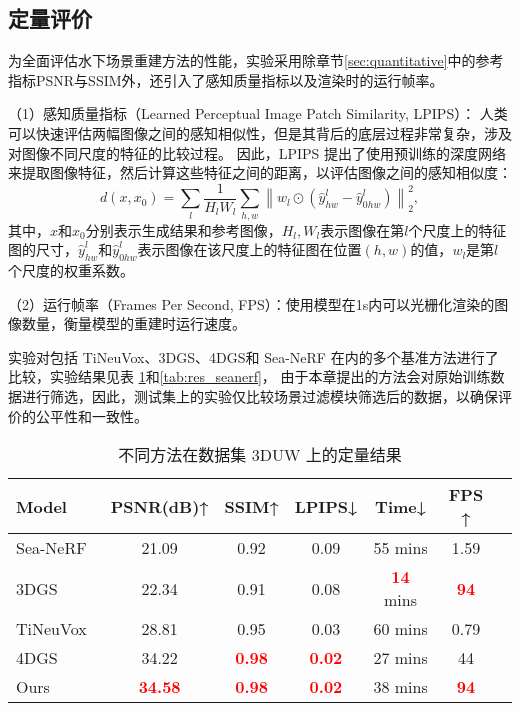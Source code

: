 \subsection{定量评价}
为全面评估水下场景重建方法的性能，实验采用除章节\ref{sec:quantitative}中的参考指标PSNR与SSIM外，还引入了感知质量指标以及渲染时的运行帧率。

（1）感知质量指标（Learned Perceptual Image Patch Similarity, LPIPS）\cite{lpips}： 人类可以快速评估两幅图像之间的感知相似性，但是其背后的底层过程非常复杂，涉及对图像不同尺度的特征的比较过程。
因此，LPIPS 提出了使用预训练的深度网络来提取图像特征，然后计算这些特征之间的距离，以评估图像之间的感知相似度：
\begin{equation}
    d(x, x_0) = \sum_{l} \frac{1}{H_l W_l} \sum_{h,w} \left\| w_l \odot (\hat{y}^l_{hw} - \hat{y}^l_{0hw}) \right\|_2^2,
\end{equation}
其中，$x$和$x_0$分别表示生成结果和参考图像，$H_l,W_l$表示图像在第$l$个尺度上的特征图的尺寸，$\hat{y}^l_{hw}$和$\hat{y}^l_{0hw}$表示图像在该尺度上的特征图在位置$(h, w)$的值，$w_l$是第$l$个尺度的权重系数。

（2）运行帧率（Frames Per Second, FPS）：使用模型在1s内可以光栅化渲染的图像数量，衡量模型的重建时运行速度。

实验对包括 TiNeuVox\cite{tineuvox}、3DGS\cite{3DGS}、4DGS\cite{4DGS}和 Sea-NeRF\cite{seathru}
在内的多个基准方法进行了比较，实验结果见表 \ref{tab:res_3duw}和\ref{tab:res_seanerf}，
由于本章提出的方法会对原始训练数据进行筛选，因此，测试集上的实验仅比较场景过滤模块筛选后的数据，以确保评价的公平性和一致性。

\begin{table} [htbp]
    \small
    \centering
    \caption{不同方法在数据集 3DUW 上的定量结果}
    \setlength{\tabcolsep}{10pt}
    \begin{tabular}{lcccccc} 
    \toprule
    Model  & PSNR(dB)↑ & SSIM↑ & LPIPS↓ & Time↓ &  FPS ↑  \\
    \midrule  
    Sea-NeRF\cite{seathru} & 21.09& 0.92 & 0.09 & 55 mins & 1.59\\
    3DGS~\cite{3DGS} &22.34 & 0.91 & 0.08 & \textcolor{red}{\textbf{14}} mins  & \textcolor{red}{\textbf{94}}\\
    TiNeuVox~\cite{tineuvox}  & 28.81 & 0.95 &  0.03 & 60 mins & 0.79\\ 
    4DGS\cite{4DGS} & 34.22&\textcolor{red}{\textbf{0.98}} &\textcolor{red}{\textbf{0.02}}& 27 mins&44 \\
    Ours & \textcolor{red}{\textbf{34.58}} & \textcolor{red}{\textbf{0.98}} & \textcolor{red}{\textbf{0.02}} & 38 mins & \textcolor{red}{\textbf{94}}\\
    \bottomrule
    \end{tabular}  
    \label{tab:res_3duw}
\end{table}
    
